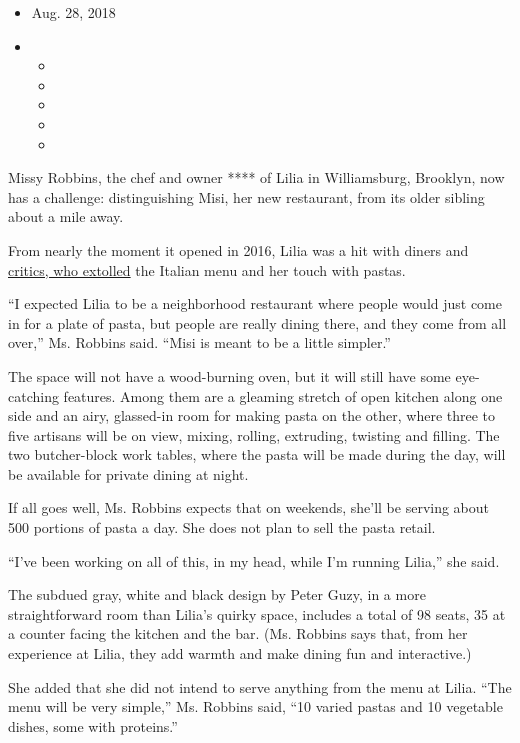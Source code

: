 \begin{itemize}
\item
  Aug. 28, 2018
\item
  \begin{itemize}
  \item
  \item
  \item
  \item
  \item
  \end{itemize}
\end{itemize}

Missy Robbins, the chef and owner **** of Lilia in Williamsburg,
Brooklyn, now has a challenge: distinguishing Misi, her new restaurant,
from its older sibling about a mile away.

From nearly the moment it opened in 2016, Lilia was a hit with diners
and
\href{https://www.nytimes3xbfgragh.onion/2016/03/30/dining/lilia-restaurant-review.html}{critics,
who extolled} the Italian menu and her touch with pastas.

``I expected Lilia to be a neighborhood restaurant where people would
just come in for a plate of pasta, but people are really dining there,
and they come from all over,'' Ms. Robbins said. ``Misi is meant to be a
little simpler.''

The space will not have a wood-burning oven, but it will still have some
eye-catching features. Among them are a gleaming stretch of open kitchen
along one side and an airy, glassed-in room for making pasta on the
other, where three to five artisans will be on view, mixing, rolling,
extruding, twisting and filling. The two butcher-block work tables,
where the pasta will be made during the day, will be available for
private dining at night.

If all goes well, Ms. Robbins expects that on weekends, she'll be
serving about 500 portions of pasta a day. She does not plan to sell the
pasta retail.

``I've been working on all of this, in my head, while I'm running
Lilia,'' she said.

The subdued gray, white and black design by Peter Guzy, in a more
straightforward room than Lilia's quirky space, includes a total of 98
seats, 35 at a counter facing the kitchen and the bar. (Ms. Robbins says
that, from her experience at Lilia, they add warmth and make dining fun
and interactive.)

She added that she did not intend to serve anything from the menu at
Lilia. ``The menu will be very simple,'' Ms. Robbins said, ``10 varied
pastas and 10 vegetable dishes, some with proteins.''

